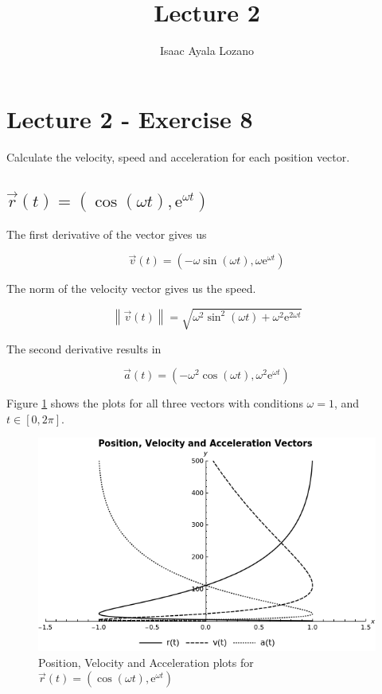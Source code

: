 \documentclass[letterpaper,12pt]{article}
\title{Lecture 2}
\author{Isaac Ayala Lozano}
\begin{document}



\section{Lecture 2 - Exercise 8}

Calculate the velocity, speed and acceleration for each 
position vector.



\subsection{$\vec{r}(t)= (\cos (\omega t), \mathrm{e}^{\omega t})$}

The first derivative of the vector gives us

\begin{equation*}
 \vec{v}(t) = (- \omega \sin (\omega t), \omega \mathrm{e}^{\omega t})
 \end{equation*}

The norm of the velocity vector gives us the speed.
 
 \begin{equation*}
  \left \| \vec{v}(t) \right \| = \sqrt{ \omega^2 \sin^2 (\omega t) + \omega ^2 
\mathrm{e}^{2 \omega t}}
 \end{equation*}

 The second derivative results in 
 
 \begin{equation*}
  \vec{a}(t) = (-\omega ^2 \cos (\omega t) , \omega ^2 
\mathrm{e}^{\omega t})
 \end{equation*}

Figure \ref{fig: vector 1} shows the plots for all three vectors with 
conditions $\omega = 1$, and $t \in \left [ 0, 2 \pi \right ] $.
 
\begin{figure}[h]
 \centering

\includegraphics[scale=0.65,keepaspectratio=true]{./img/graph01.png}
 \caption{Position, Velocity and Acceleration plots for 
$\vec{r}(t)= (\cos (\omega t), \mathrm{e}^{\omega t})$
}
 \label{fig: vector 1}
\end{figure}
\end{document}
